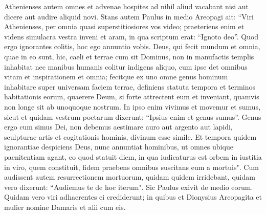 \begin{biblechapter}
\verse Athenienses autem omnes et advenae hospites ad nihil aliud vacabant nisi aut dicere aut audire aliquid novi. 
\verse Stans autem Paulus in medio Areopagi ait: “Viri Athenienses, per omnia quasi superstitiosiores vos video; 
\verse praeteriens enim et videns simulacra vestra inveni et aram, in qua scriptum erat: “Ignoto deo”. Quod ergo ignorantes colitis, hoc ego annuntio vobis. 
\verse Deus, qui fecit mundum et omnia, quae in eo sunt, hic, caeli et terrae cum sit Dominus, non in manufactis templis inhabitat 
\verse nec manibus humanis colitur indigens aliquo, cum ipse det omnibus vitam et inspirationem et omnia; 
\verse fecitque ex uno omne genus hominum inhabitare super universam faciem terrae, definiens statuta tempora et terminos habitationis eorum, 
\verse quaerere Deum, si forte attrectent eum et inveniant, quamvis non longe sit ab unoquoque nostrum. 
\verse In ipso enim vivimus et movemur et sumus, sicut et quidam vestrum poetarum dixerunt: “Ipsius enim et genus sumus”. 
\verse Genus ergo cum simus Dei, non debemus aestimare auro aut argento aut lapidi, sculpturae artis et cogitationis hominis, divinum esse simile. 
\verse Et tempora quidem ignorantiae despiciens Deus, nunc annuntiat hominibus, ut omnes ubique paenitentiam agant, 
\verse eo quod statuit diem, in qua iudicaturus est orbem in iustitia in viro, quem constituit, fidem praebens omnibus suscitans eum a mortuis". 
\verse Cum audissent autem resurrectionem mortuorum, quidam quidem irridebant, quidam vero dixerunt: “Audiemus te de hoc iterum". 
\verse Sic Paulus exivit de medio eorum. 
\verse Quidam vero viri adhaerentes ei crediderunt; in quibus et Dionysius Areopagita et mulier nomine Damaris et alii cum eis. 
\end{biblechapter}

